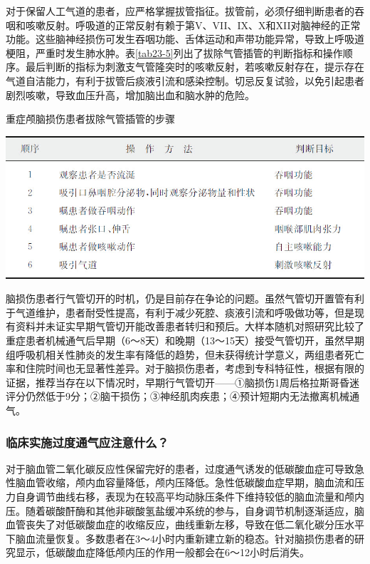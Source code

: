 对于保留人工气道的患者，应严格掌握拔管指征。拔管前，必须仔细判断患者的吞咽和咳嗽反射。呼吸道的正常反射有赖于第V、VII、IX、X和XII对脑神经的正常功能。这些脑神经损伤可发生吞咽功能、舌体运动和声带功能异常，导致上呼吸道梗阻，严重时发生肺水肿。表\ref{tab23-5}列出了拔除气管插管的判断指标和操作顺序。最后判断的指标为刺激支气管隆突时的咳嗽反射，若咳嗽反射存在，提示存在气道自洁能力，有利于拔管后痰液引流和感染控制。切忌反复试验，以免引起患者剧烈咳嗽，导致血压升高，增加脑出血和脑水肿的危险。

\begin{table}[htbp]
\centering
\caption{重症颅脑损伤患者拔除气管插管的步骤}
\label{tab23-5}
\includegraphics{./images/Image00275.jpg}
\end{table}

脑损伤患者行气管切开的时机，仍是目前存在争论的问题。虽然气管切开置管有利于气道维护，患者耐受性提高，有利于减少死腔、痰液引流和呼吸做功等，但是现有资料并未证实早期气管切开能改善患者转归和预后。大样本随机对照研究比较了重症患者机械通气后早期（6～8天）和晚期（13～15天）接受气管切开，虽然早期组呼吸机相关性肺炎的发生率有降低的趋势，但未获得统计学意义，两组患者死亡率和住院时间也无显著性差异。对于脑损伤患者，考虑到专科特征性，根据有限的证据，推荐当存在以下情况时，早期行气管切开------①脑损伤1周后格拉斯哥昏迷评分仍然低于9分；②脑干损伤；③神经肌肉疾患；④预计短期内无法撤离机械通气。

\subsubsection{临床实施过度通气应注意什么？}

对于脑血管二氧化碳反应性保留完好的患者，过度通气诱发的低碳酸血症可导致急性脑血管收缩，颅内血容量降低，颅内压降低。急性低碳酸血症早期，脑血流和压力自身调节曲线右移，表现为在较高平均动脉压条件下维持较低的脑血流量和颅内压。随着碳酸酐酶和其他非碳酸氢盐缓冲系统的参与，自身调节机制逐渐适应，脑血管丧失了对低碳酸血症的收缩反应，曲线重新左移，导致在低二氧化碳分压水平下脑血流量恢复。多数患者在3～4小时内重新建立新的稳态。针对脑损伤患者的研究显示，低碳酸血症降低颅内压的作用一般都会在6～12小时后消失。

